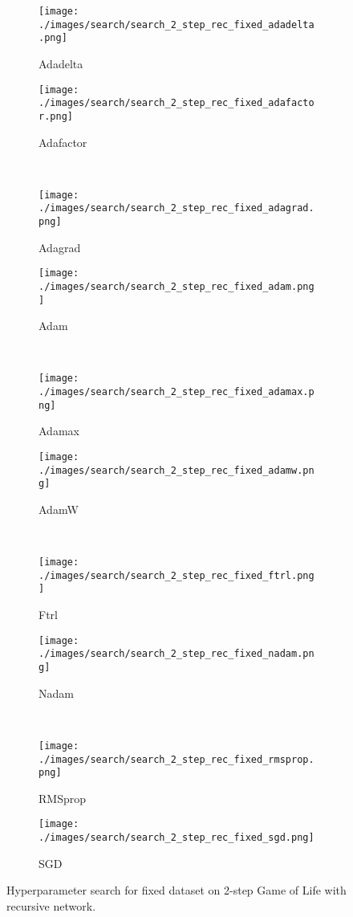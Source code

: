 \documentclass[letterpaper]{article} %
\begin{document}
\clearpage
\begin{figure*}[ht!]
    \centering
    \begin{subfigure}{.49\linewidth}
        \texttt{[image: ./images/search/search\_2\_step\_rec\_fixed\_adadelta.png]}
        \caption{Adadelta}
    \end{subfigure}
    \begin{subfigure}{.49\linewidth}
        \texttt{[image: ./images/search/search\_2\_step\_rec\_fixed\_adafactor.png]}
        \caption{Adafactor}
    \end{subfigure}
    \\
    \begin{subfigure}{.49\linewidth}
        \texttt{[image: ./images/search/search\_2\_step\_rec\_fixed\_adagrad.png]}
        \caption{Adagrad}
    \end{subfigure}
    \begin{subfigure}{.49\linewidth}
        \texttt{[image: ./images/search/search\_2\_step\_rec\_fixed\_adam.png]}
        \caption{Adam}
    \end{subfigure}
    \\
    \begin{subfigure}{.49\linewidth}
        \texttt{[image: ./images/search/search\_2\_step\_rec\_fixed\_adamax.png]}
        \caption{Adamax}
    \end{subfigure}
    \begin{subfigure}{.49\linewidth}
        \texttt{[image: ./images/search/search\_2\_step\_rec\_fixed\_adamw.png]}
        \caption{AdamW}
    \end{subfigure}
    \\
    \begin{subfigure}{.49\linewidth}
        \texttt{[image: ./images/search/search\_2\_step\_rec\_fixed\_ftrl.png]}
        \caption{Ftrl}
    \end{subfigure}
    \begin{subfigure}{.49\linewidth}
        \texttt{[image: ./images/search/search\_2\_step\_rec\_fixed\_nadam.png]}
        \caption{Nadam}
    \end{subfigure}
    \\
    \begin{subfigure}{.49\linewidth}
        \texttt{[image: ./images/search/search\_2\_step\_rec\_fixed\_rmsprop.png]}
        \caption{RMSprop}
    \end{subfigure}
    \begin{subfigure}{.49\linewidth}
        \texttt{[image: ./images/search/search\_2\_step\_rec\_fixed\_sgd.png]}
        \caption{SGD}
    \end{subfigure}
    \caption{Hyperparameter search for fixed dataset on 2-step Game of Life with recursive network.}
    \label{fig:search_2_rec_fixed}
\end{figure*}
\end{document}
